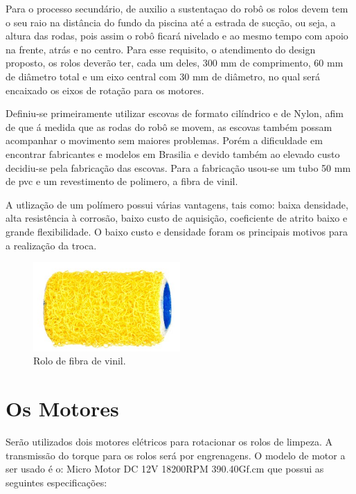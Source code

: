Para o processo secundário, de auxilio a sustentaçao do robô os rolos devem tem o seu raio na distância do fundo da piscina até a estrada de sucção, ou seja, a altura das rodas, pois assim o robô ficará nivelado e ao mesmo tempo com apoio na frente, atrás e no centro. Para esse requisito, o atendimento do design proposto, os rolos deverão ter, cada um deles, 300 mm de comprimento, 60 mm de diâmetro total e um eixo central com 30 mm de diâmetro, no qual será encaixado os eixos de rotação para os motores.

Definiu-se primeiramente utilizar escovas de formato cilíndrico e de Nylon, afim de que á medida que as rodas do robô se movem, as escovas também possam acompanhar o movimento sem maiores problemas. Porém a dificuldade em encontrar fabricantes e modelos em Brasilia e devido também ao elevado custo decidiu-se pela fabricação das escovas. Para a fabricação usou-se um tubo 50 mm de pvc e um revestimento de polimero, a fibra de vinil. 

A utlização de um polímero possui várias vantagens, tais como: baixa densidade, alta resistência à corrosão, baixo custo de aquisição, coeficiente de atrito baixo e grande flexibilidade. O baixo custo e densidade foram os principais motivos para a realização da troca.
\par
  \begin{figure}[h]
    \centering
    \includegraphics[width=0.5\textwidth]{figures/brush-vinil.png}
    \caption{Rolo de fibra de vinil.}
    \label{fig:brush-vinil}
  \end{figure}
  \FloatBarrier
\par

\section{Os Motores}
Serão utilizados dois motores elétricos para rotacionar os rolos de limpeza. A transmissão do torque para os rolos será por engrenagens. O modelo de motor a ser usado é o: Micro Motor DC 12V 18200RPM 390.40Gf.cm que possui as seguintes especificações:

